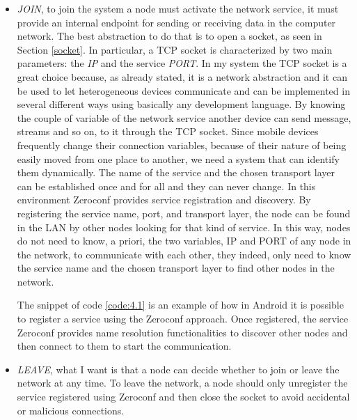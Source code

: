 \begin{itemize}
	\item \textit{JOIN}, to join the system a node must activate the network service, it must provide an internal endpoint for sending or receiving data in the computer network. The best abstraction to do that is to open a socket, as seen in Section \ref{socket}. In particular, a TCP socket is characterized by two main parameters: the \textit{IP} and the service \textit{PORT}. In my system the TCP socket is a great choice because, as already stated, it is a network abstraction and it can be used to let  heterogeneous devices communicate and can be implemented in several different ways using basically any development language. By knowing the couple of variable of the network service another device can send message, streams and so on, to it through the TCP socket.  Since mobile devices frequently change their connection variables, because of their nature of being easily moved from one place to another, we need a system that can identify them dynamically. The name of the service and the chosen transport layer can be established once and for all and they can never change. In this environment Zeroconf provides service registration and discovery. By registering the service name, port, and transport layer, the node can be found in the LAN by other nodes looking for that kind of service. In this way, nodes do not need to know, a priori, the two variables, IP and PORT of any node in the network, to communicate with each other, they indeed, only need to know the service name and the chosen transport layer to find other nodes in the network.
	
	The snippet of code \ref{code:4.1} is an example of how in Android it is possible to register a service using the Zeroconf approach. Once registered, the service Zeroconf provides name resolution functionalities to discover other nodes and then connect to them to start the communication.
	\item \textit{LEAVE}, what I want is that a node can decide whether to join or leave the network at any time. To leave the network, a node should only unregister the service registered using Zeroconf and then close the socket to avoid accidental or malicious connections.

\end{itemize}
